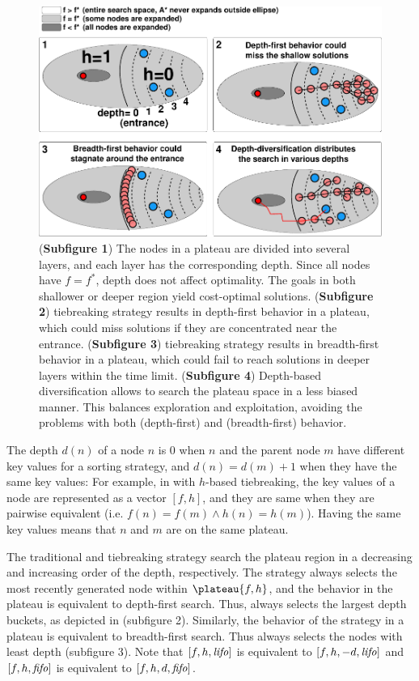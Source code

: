 \begin{figure}[htbp]
  \centering
  \includegraphics{img/astar/plateau-2.pdf}
 \caption{(\textbf{Subfigure 1}) The nodes in a plateau are divided into several layers, and each layer has the corresponding depth. Since all nodes have $f=f^*$, depth does not affect optimality. The goals in both shallower or deeper region yield cost-optimal solutions.
 (\textbf{Subfigure 2}) \lifo tiebreaking strategy results in depth-first behavior in a
 plateau, which could miss solutions if they are concentrated near the entrance.
 (\textbf{Subfigure 3}) \fifo tiebreaking strategy results in  breadth-first behavior in a
 plateau, which could fail to reach solutions in deeper layers within the time limit.
 (\textbf{Subfigure 4}) Depth-based diversification allows \astar to search the plateau space
 in a less biased manner. This balances exploration and exploitation, avoiding the problems with both \lifo (depth-first) and \fifo (breadth-first) behavior.
 }
 \label{fig:plateau-depiction}
\end{figure}

The depth $d(n)$ of a
node $n$ is 0 when $n$ and the parent node $m$ have different key
values for a sorting strategy, and $d(n)=d(m)+1$ when they have the same
key values: For example, in \astar with $h$-based tiebreaking, the key
values of a node are represented as a vector $[f,h]$, and they are same
when they are pairwise equivalent (i.e. $f(n) = f(m) \land h(n) =
h(m)$).  Having the same key values means that $n$ and $m$ are on the
same plateau.

The traditional \lifo and \fifo tiebreaking strategy 
search the plateau region in a decreasing and increasing order of the depth, respectively.
The \lifo strategy always selects the most recently generated node
within $\plateau{f,h}$, and the behavior in the plateau is equivalent to depth-first search.
Thus, \lifo always selects the largest depth
buckets, as depicted in  (subfigure 2).
Similarly, the behavior of the \fifo strategy 
in a plateau is equivalent to breadth-first search. Thus \fifo 
always selects the nodes with least depth (subfigure 3).
Note that  $[f,h,{\text{\textit{lifo}}}]$ is equivalent to $[f,h,-d,{\text{\textit{lifo}}}]$ and
$[f,h,{\text{\textit{fifo}}}]$ is equivalent to $[f,h,d,{\text{\textit{fifo}}}]$.

